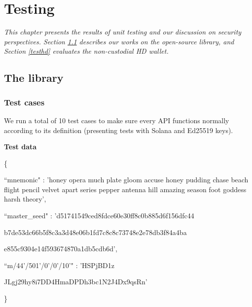\chapter{Testing}
\label{chap:testing}
\textit{This chapter presents the results of unit testing and our discussion on security perspectives. Section \ref{testlib} describes our works on the open-source library, and Section \ref{testhd} evaluates the non-custodial HD wallet.}

\minitoc

\section{The library}
\label{testlib}
\subsection{Test cases}

We run a total of 10 test cases to make sure every API functions normally according to its definition (presenting tests with Solana and Ed25519 keys). 

\bigskip
{\textbf{Test data}}

\begin{framed}
    \hspace*{13mm}        \{ \par
    \hspace*{13mm}        ``mnemonic" : 'honey opera much plate gloom accuse honey pudding chase beach flight pencil velvet apart series pepper antenna hill amazing season foot goddess harsh theory',    \par
    \hspace*{13mm}        ``master\_seed" : 'd51741549ced8fdce60e30ff8c0b885d6f156dfc44 \par
    \hspace*{27mm}         b7de53dc66b5f8c3a3d48e06b1fd7c8c8c73748e2e78db3f84a4ba \par
    \hspace*{27mm}         e855c9304e14f593674870a1db5cdb6d',    \par
    \hspace*{13mm}        ``m/44'/501'/0'/0'/10'" : 'HSPjBD1z \par
    \hspace*{37mm}        JLgj29hy8i7DD4HmaDPDh3bc1N2J4Dx9qsRn' \par
    \hspace*{13mm}              \} \par
    \end{framed}

